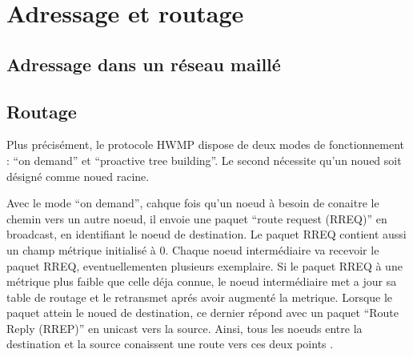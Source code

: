 \chapter{Adressage et routage}
\section{Adressage dans un réseau maillé}
\section{Routage}
Plus précisément, le protocole HWMP dispose de deux modes de fonctionnement : ``on demand'' et ``proactive tree building''. Le
second nécessite qu'un noued soit désigné comme noued racine\cite{MNroute}.

Avec le mode ``on demand'', cahque fois qu'un noeud à besoin de conaitre le chemin vers un autre noeud, il envoie une paquet
``route request (RREQ)'' en broadcast, en identifiant le noeud de destination. Le paquet RREQ contient aussi un champ métrique
initialisé à 0. Chaque noeud intermédiaire va recevoir le paquet RREQ, eventuellementen plusieurs exemplaire. Si le paquet RREQ
à une métrique plus faible que celle déja connue, le noeud intermédiaire met a jour sa table de routage et le retransmet aprés avoir 
augmenté la metrique. Lorsque le paquet attein le noued de destination, ce dernier répond avec un paquet ``Route Reply (RREP)''
en unicast vers la source. Ainsi, tous les noeuds entre la destination et la source conaissent une route vers ces deux points
\cite{MNroute}.